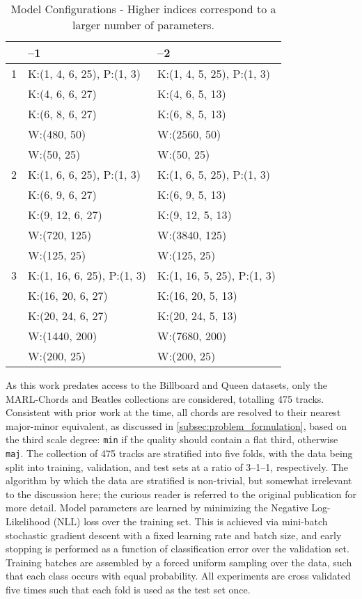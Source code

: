 \begin{table}[!t]
\renewcommand{\arraystretch}{1.4}
\caption{Model Configurations - Higher indices correspond to a larger number of parameters.}
\label{table:model_configs}
\centering
\begin{tabular}{c || l || l |}
 & --1 & --2 \\
\hline
 1 & K:(1, 4, 6, 25), P:(1, 3)& K:(1, 4, 5, 25), P:(1, 3)\\
 &K:(4, 6, 6, 27) & K:(4, 6, 5, 13) \\
 &K:(6, 8, 6, 27) & K:(6, 8, 5, 13) \\
 &W:(480, 50)  & W:(2560, 50)\\
 &W:(50, 25)  & W:(50, 25)\\
\hline
 2 & K:(1, 6, 6, 25), P:(1, 3)& K:(1, 6, 5, 25), P:(1, 3)\\
 &K:(6, 9, 6, 27) & K:(6, 9, 5, 13) \\
 &K:(9, 12, 6, 27) & K:(9, 12, 5, 13) \\
 &W:(720, 125)  & W:(3840, 125)\\
 &W:(125, 25)  & W:(125, 25)\\
\hline
 3 & K:(1, 16, 6, 25), P:(1, 3)& K:(1, 16, 5, 25), P:(1, 3)\\
 &K:(16, 20, 6, 27) & K:(16, 20, 5, 13) \\
 &K:(20, 24, 6, 27) & K:(20, 24, 5, 13) \\
 &W:(1440, 200)  & W:(7680, 200)\\
 &W:(200, 25)  & W:(200, 25)\\
\hline
\end{tabular}
\end{table}


As this work predates access to the Billboard and Queen datasets, only the MARL-Chords and Beatles collections are considered, totalling 475 tracks.
Consistent with prior work at the time, all chords are resolved to their nearest major-minor equivalent, as discussed in \ref{subsec:problem_formulation}, based on the third scale degree: \texttt{min} if the quality should contain a flat third, otherwise \texttt{maj}.
The collection of 475 tracks are stratified into five folds, with the data being split into training, validation, and test sets at a ratio of 3--1--1, respectively.
The algorithm by which the data are stratified is non-trivial, but somewhat irrelevant to the discussion here; the curious reader is referred to the original publication for more detail.
Model parameters are learned by minimizing the Negative Log-Likelihood (NLL) loss over the training set.
This is achieved via mini-batch stochastic gradient descent with a fixed learning rate and batch size, and early stopping is performed as a function of classification error over the validation set.
Training batches are assembled by a forced uniform sampling over the data, such that each class occurs with equal probability.
All experiments are cross validated five times such that each fold is used as the test set once.


